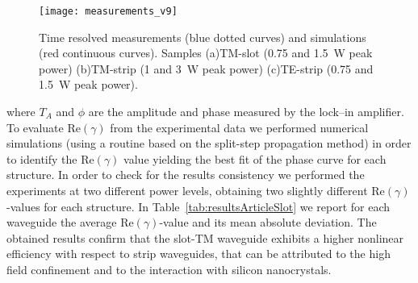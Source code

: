                                                                 
\begin{figure}[htb]
  \centering
  \texttt{[image: measurements\_v9]}
  \caption{Time resolved measurements (blue dotted curves) and simulations (red continuous curves). Samples (a)TM-slot (0.75 and 1.5~W peak power) (b)TM-strip (1 and 3~W peak power) (c)TE-strip (0.75 and 1.5~W peak power).}
  \label{fig:timeResolvesMeasurementsTimeRes}
\end{figure}

where $T_A$ and $\phi$ are the amplitude and phase measured by the lock--in amplifier.
To evaluate Re$(\gamma)$ from the experimental data we performed numerical simulations (using a routine based on the split-step propagation method) in order to identify the Re$(\gamma)$ value yielding the best fit of the phase curve for each structure. In order to check for the results consistency we performed the experiments at two different power levels, obtaining two slightly different Re$(\gamma)$-values for each structure. In Table~\ref{tab:resultsArticleSlot} we report for each waveguide the average Re$(\gamma)$-value and its mean absolute deviation. 
The obtained results confirm that the slot-TM waveguide exhibits a higher nonlinear efficiency with respect to strip waveguides, that can be attributed to the high field confinement and to the interaction with silicon nanocrystals.


